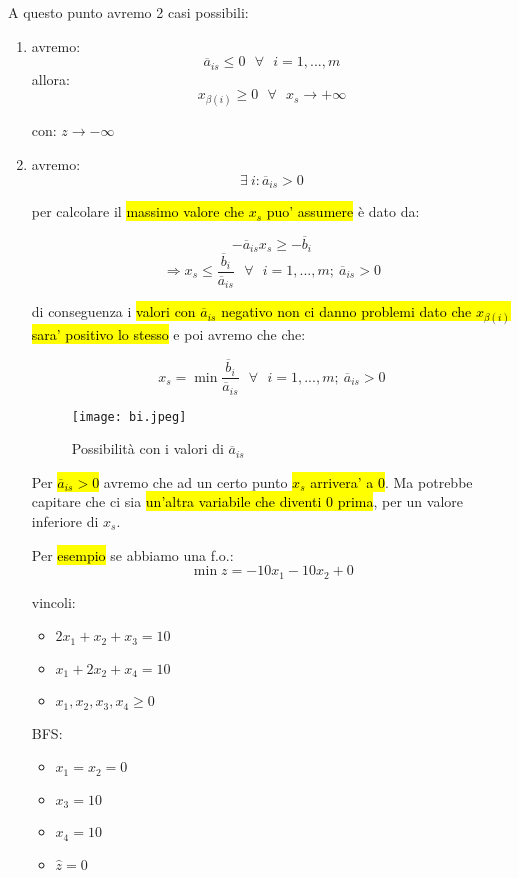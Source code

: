 A questo punto avremo 2 casi possibili:
\begin{enumerate}
	\item avremo:
		$$\overline{a}_{is} \leq 0\ \ \ \forall\ \ \ i = 1, ..., m$$
		allora:
		$$x_{\beta(i)} \geq 0\ \ \ \forall\ \ \ x_s \to +\infty$$
		
		con: $z \to -\infty$
	
	\item avremo:
		$$\exists\ i : \overline{a}_{is} > 0$$

		per calcolare il \hl{massimo valore che $x_s$ puo' assumere} è dato da:

		$$-\overline{a}_{is} x_s \geq -\overline{b}_i$$
		$$\Rightarrow x_s \leq \frac{\overline{b}_i}{\overline{a}_{is}}\ \ \ \forall\ \ \ i = 1, ..., m;\ \overline{a}_{is} > 0$$

		di conseguenza i \hl{valori con $\overline{a}_{is}$ negativo non ci danno problemi dato che $x_{\beta(i)}$ sara' positivo lo stesso} e poi avremo che che:

		$$x_s = \min \frac{\overline{b}_i}{\overline{a}_{is}}\ \ \ \forall\ \ \ i = 1, ..., m;\ \overline{a}_{is} > 0$$


		\begin{figure}[H]
		\centering
		\texttt{[image: bi.jpeg]}
		\caption{Possibilità con i valori di $\overline{a}_{is}$} 
		\label{bi}
		\end{figure}


		Per \hl{$\overline{a}_{is} > 0$} avremo che ad un certo punto \hl{$x_s$ arrivera' a 0}. Ma potrebbe capitare che ci sia \hl{un'altra variabile che diventi 0 prima}, per un valore inferiore di $x_s$.

		Per \hl{esempio} se abbiamo una f.o.:
		$$\min z = -10x_1 - 10x_2 + 0$$

		vincoli:
		\begin{itemize}
			\item $2x_1 + x_2 + x_3 = 10$
			\item $x_1 + 2x_2 + x_4 = 10$
			\item $x_1, x_2, x_3, x_4 \geq 0$\\
		\end{itemize}

		BFS:
		\begin{itemize}
			\item $x_1 = x_2 = 0$
			\item $x_3 = 10$
			\item $x_4 = 10$
			\item $\hat{z} = 0$\\
		\end{itemize}


\end{enumerate}
